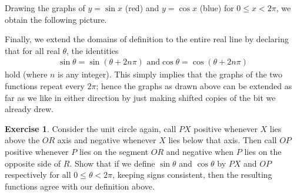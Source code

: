 \documentclass[a4paper,leqno]{article}
\numberwithin{equation}{section}
\theoremstyle{definition}
\newtheorem{exercise}[equation]{Exercise}
\theoremstyle{remark}
\begin{document}
Drawing the graphs of $ y = \sin x $ (red) and $ y = \cos x $ (blue) for $ 0 \leq x < 2\pi $, we obtain the
following picture.
\begin{center}
\end{center}

Finally, we extend the domains of definition to the entire real line by declaring that for all real $ \theta $, the identities
\begin{gather}
  \sin \theta = \sin (\theta + 2n\pi)\text{ and}
  \cos \theta = \cos (\theta + 2n\pi)
\end{gather}
hold (where $ n $ is any integer). This simply implies that the graphs of the two functions repeat every $ 2\pi $; hence the graphs
as drawn above can be extended as far as we like in either direction by just making shifted copies of the bit we already drew.
\begin{center}
\end{center}

\begin{exercise}
  Consider the unit circle again, call $ PX $ positive whenever $ X $ lies above the $ OR $ axis and negative whenever $ X $ lies below that
  axis. Then call $ OP $ positive whenever $ P $ lies on the segment $ OR $ and negative when $ P $ lies on the opposite side of $ R $. Show
  that if we define $ \sin \theta $ and $ \cos \theta $ by $ PX $ and $ OP $ respectively for all $ 0 \leq \theta < 2\pi $, keeping signs
  consistent, then the resulting functions agree with our definition above.
\end{exercise}
\end{document}
